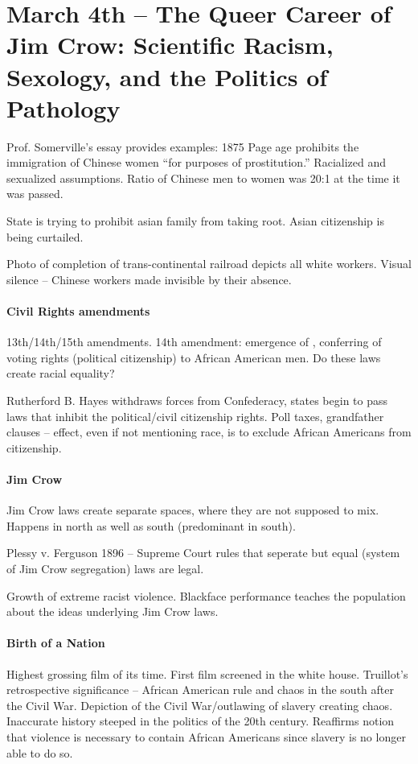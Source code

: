 \section{March 4th -- The Queer Career of Jim Crow: Scientific Racism, Sexology, and the Politics of Pathology}

Prof. Somerville's essay provides examples: 1875 Page age prohibits the immigration of Chinese women ``for purposes of prostitution.'' Racialized and sexualized assumptions. Ratio of Chinese men to women was 20:1 at the time it was passed.

State is trying to prohibit asian family from taking root. Asian citizenship is being curtailed.

Photo of completion of trans-continental railroad depicts all white workers. Visual silence -- Chinese workers made invisible by their absence.

\paragraph{Civil Rights amendments} 13th/14th/15th amendments. 14th amendment: emergence of , conferring of voting rights (political citizenship) to African American men. Do these laws create racial equality?

Rutherford B. Hayes withdraws forces from Confederacy, states begin to pass laws that inhibit the political/civil citizenship rights. Poll taxes, grandfather clauses -- effect, even if not mentioning race, is to exclude African Americans from citizenship.

\paragraph{Jim Crow} Jim Crow laws create separate spaces, where they are not supposed to mix. Happens in north as well as south (predominant in south).

Plessy v. Ferguson 1896 -- Supreme Court rules that seperate but equal (system of Jim Crow segregation) laws are legal.

Growth of extreme racist violence. Blackface performance teaches the population about the ideas underlying Jim Crow laws.

\paragraph{Birth of a Nation} Highest grossing film of its time. First film screened in the white house. Truillot's retrospective significance -- African American rule and chaos in the south after the Civil War. Depiction of the Civil War/outlawing of slavery creating chaos. Inaccurate history steeped in the politics of the 20th century. Reaffirms notion that violence is necessary to contain African Americans since slavery is no longer able to do so.

